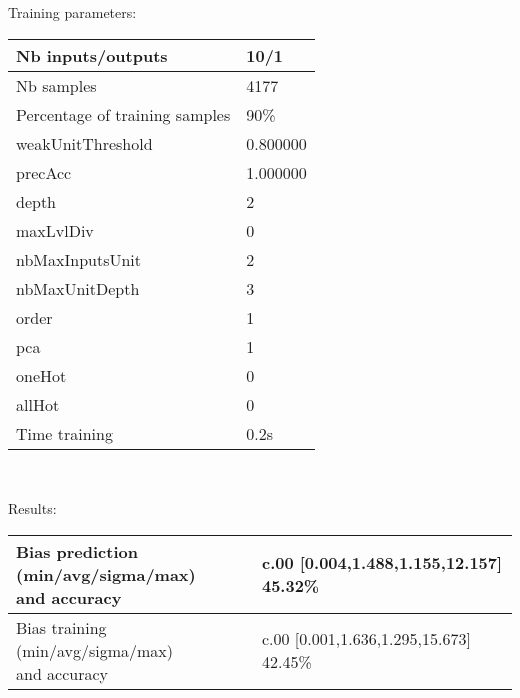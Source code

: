 Training parameters:\\
\begin{center}
\begin{tabular}{|l|l|}
\hline
Nb inputs/outputs&10/1\\
\hline
Nb samples&4177\\
\hline
Percentage of training samples&90\%\\
\hline
weakUnitThreshold&0.800000\\
\hline
precAcc&1.000000\\
\hline
depth&2\\
\hline
maxLvlDiv&0\\
\hline
nbMaxInputsUnit&2\\
\hline
nbMaxUnitDepth&3\\
\hline
order&1\\
\hline
pca&1\\
\hline
oneHot&0\\
\hline
allHot&0\\
\hline
Time training&0.2s\\
\hline
\end{tabular}\\
\end{center}\newline
Results:
\begin{center}
\begin{tabular}{|l|l|}
\hline
\makecell{Bias prediction (min/avg/sigma/max)\\and accuracy}&\makecell{c.00 [0.004,1.488,1.155,12.157] 45.32\%\\
}\\

\hline
\makecell{Bias training (min/avg/sigma/max)\\and accuracy}&\makecell{c.00 [0.001,1.636,1.295,15.673] 42.45\%\\
}\\
\hline
\end{tabular}\
\end{center}
